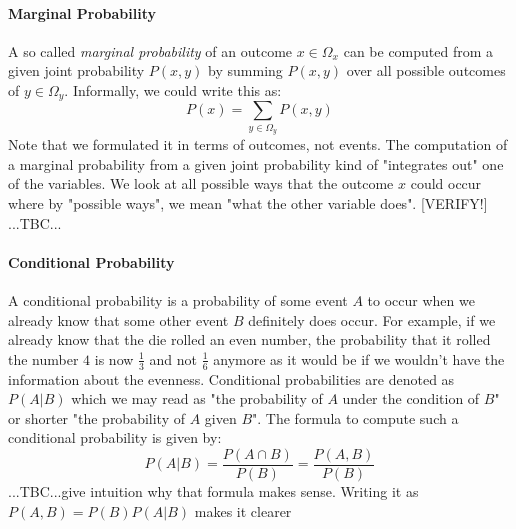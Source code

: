 % 





\paragraph{Marginal Probability}
A so called \emph{marginal probability} of an outcome $x \in \Omega_x$ can be computed from a given joint probability $P(x,y)$ by summing $P(x,y)$ over all possible outcomes of $y \in \Omega_y$. Informally, we could write this as:
\begin{equation}
P(x) = \sum_{y \in \Omega_y} P(x,y)
\end{equation}
Note that we formulated it in terms of outcomes, not events. The computation of a marginal probability from a given joint probability kind of "integrates out" one of the variables. We look at all possible ways that the outcome $x$ could occur where by "possible ways", we mean "what the other variable does". [VERIFY!] ...TBC...



\paragraph{Conditional Probability}
A conditional probability is a probability of some event $A$ to occur when we already know that some other event $B$ definitely does occur. For example, if we already know that the die rolled an even number, the probability that it rolled the number $4$ is now $\frac{1}{3}$ and not $\frac{1}{6}$ anymore as it would be if we wouldn't have the information about the evenness. Conditional probabilities are denoted as $P(A|B)$ which we may read as "the probability of $A$ under the condition of $B$" or shorter "the probability of $A$ given $B$". The formula to compute such a conditional probability is given by:
\begin{equation}
\label{Eq:ConditionalProbability}
 P(A|B) = \frac{P(A \cap B)}{P(B)} = \frac{P(A, B)}{P(B)}
\end{equation}
...TBC...give intuition why that formula makes sense. Writing it as $P(A,B) = P(B) P(A|B)$ makes it clearer



